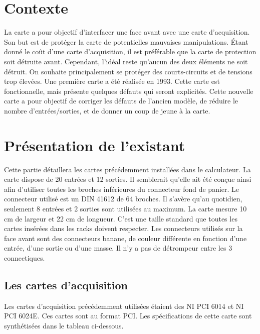 \documentclass{report}
\begin{document}


\tableofcontents
\thispagestyle{empty}
\entete
\newpage
\thispagestyle{empty}
\listoffigures
\entete
\listoftables
\entete



\chapter{Contexte}
\thispagestyle{empty}
La carte a pour objectif d'interfacer une face avant avec une carte d'acquisition. Son but est de protéger la carte de potentielles mauvaises manipulations. Étant donné le coût d'une carte d'acquisition, il est préférable que la carte de protection soit détruite avant. Cependant, l'idéal reste qu'aucun des deux éléments ne soit détruit. On souhaite principalement se protéger des courts-circuits et de tensions trop élevées.
Une première carte a été réalisée en 1993. Cette carte est fonctionnelle, mais présente quelques défauts qui seront explicités. Cette nouvelle carte a pour objectif de corriger les défauts de l'ancien modèle, de réduire le nombre d'entrées/sorties, et de donner un coup de jeune à la carte.


\chapter{Présentation de l'existant}
\thispagestyle{empty}
Cette partie détaillera les cartes précédemment installées dans le calculateur. La carte dispose de 20 entrées et 12 sorties. Il semblerait qu'elle ait été conçue ainsi afin d'utiliser toutes les broches inférieures du connecteur fond de panier. Le connecteur utilisé est un DIN 41612 de 64 broches. Il s'avère qu'au quotidien, seulement 8 entrées et 2 sorties sont utilisées au maximum. La carte mesure 10 cm de largeur et 22 cm de longueur. C'est une taille standard que toutes les cartes insérées dans les racks doivent respecter. Les connecteurs utilisés sur la face avant sont des connecteurs banane, de couleur différente en fonction d'une entrée, d'une sortie ou d'une masse. Il n'y a pas de détrompeur entre les 3 connectiques.

\section{Les cartes d'acquisition}
Les cartes d'acquisition précédemment utilisées étaient des NI PCI 6014 et NI PCI 6024E. Ces cartes sont au format PCI. Les spécifications de cette carte sont synthétisées dans le tableau ci-dessous.
\end{document}
